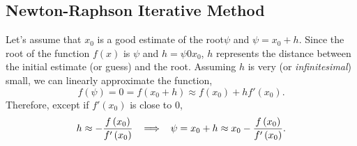 \subsection{Newton-Raphson Iterative Method}\label{Section:RootFinderMethods:NewtonRaphson}
Let's assume that $x_{0}$ is a good estimate of the root$\psi$ and $\psi = x_{0} + h$. Since the root of the function $f(x)$ is $\psi$ and $h = \psi 0 x_{0}$, $h$ represents the distance between the initial estimate (or guess) and the root. Assuming $h$ is very (or {\it infinitesimal}) small, we can linearly approximate the function,
   \begin{displaymath}
        f\left(\psi\right) = 0 = f\left(x_{0}+h\right) \approx f\left(x_{0}\right) + h f'\left(x_{0}\right).
   \end{displaymath}
Therefore, except if $f'\left(x_{0}\right)$ is close to $0$, 
   \begin{displaymath}
        h \approx -\displaystyle\frac{f\left(x_{0}\right)}{f'\left(x_{0}\right)} \hspace{.3cm} \Longrightarrow \hspace{.3cm} \psi = x_{0} + h \approx x_{0} -\displaystyle\frac{f\left(x_{0}\right)}{f'\left(x_{0}\right)}.
   \end{displaymath}
